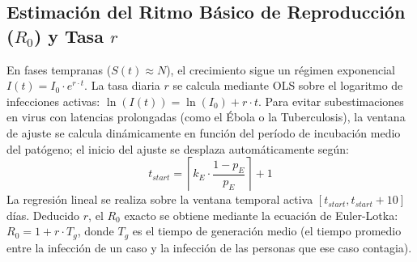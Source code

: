 \documentclass[conference]{IEEEtran}
\begin{document}
\subsection{Estimación del Ritmo Básico de Reproducción ($R_0$) y Tasa $r$}
En fases tempranas ($S(t) \approx N$), el crecimiento sigue un régimen exponencial $I(t) = I_0 \cdot e^{r \cdot t}$. La tasa diaria $r$ se calcula mediante OLS sobre el logaritmo de infecciones activas: $\ln(I(t)) = \ln(I_0) + r \cdot t$. Para evitar subestimaciones en virus con latencias prolongadas (como el Ébola o la Tuberculosis), la ventana de ajuste se calcula dinámicamente en función del período de incubación medio del patógeno; el inicio del ajuste se desplaza automáticamente según:
\begin{equation}
t_{start} = \left\lceil k_E \cdot \frac{1 - p_E}{p_E} \right\rceil + 1
\end{equation}
La regresión lineal se realiza sobre la ventana temporal activa $[t_{start}, t_{start}+10]$ días. Deducido $r$, el $R_0$ exacto se obtiene mediante la ecuación de Euler-Lotka: $R_0 = 1 + r \cdot T_g$, donde $T_g$ es el tiempo de generación medio (el tiempo promedio entre la infección de un caso y la infección de las personas que ese caso contagia).
\end{document}
